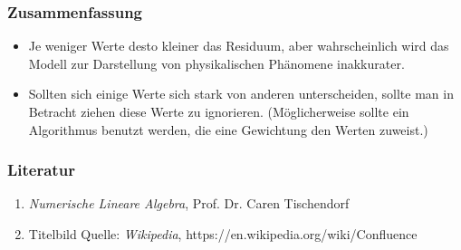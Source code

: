 \documentclass{beamer}
\begin{document}
\begin{frame}
    \frametitle{Zusammenfassung}
    
    \begin{itemize}
    
    \item Je weniger Werte desto kleiner das Residuum, aber wahrscheinlich wird das Modell zur Darstellung von physikalischen Phänomene inakkurater. 
    \item Sollten sich einige Werte sich stark von anderen unterscheiden, sollte man in Betracht ziehen diese Werte zu ignorieren. (Möglicherweise sollte ein Algorithmus benutzt werden, die eine Gewichtung den Werten zuweist.)
    \end{itemize}
    
\end{frame}


\begin{frame}
\frametitle{Literatur}
\begin{enumerate}

\item \textit{Numerische Lineare Algebra}, Prof. Dr. Caren Tischendorf
\item Titelbild Quelle: \textit{Wikipedia}, https://en.wikipedia.org/wiki/Confluence

\end{enumerate}

\end{frame}
\end{document}
